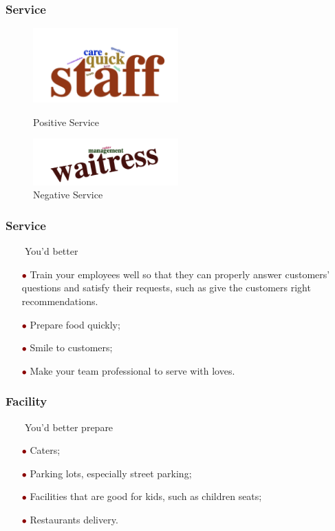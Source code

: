 \documentclass[notheorems, aspectratio=54]{beamer}
\renewcommand\textbullet{\ensuremath{\bullet}}
\begin{document}
\begin{frame}
\frametitle{Service}
\begin{figure}
	\begin{minipage}[t]{0.5\linewidth}
		\centering
		\includegraphics[width=2.2in]{staff_good.png}
		\caption{Positive Service}
		\label{fig:side:a}
	\end{minipage}%
	\begin{minipage}[t]{0.5\linewidth}
		\centering
		\includegraphics[width=2.2in]{staff_bad.png}
		\caption{Negative Service}
		\label{fig:side:b}
	\end{minipage}
\end{figure}
\end{frame}

\begin{frame}
\frametitle{Service}
\ \ \ \ You'd better
\begin{itemize}
	\item[\textcolor{darkred}{\textbullet}] Train your employees well so that they can properly answer customers' questions and satisfy their requests, such as give the customers right recommendations.
	\item[\textcolor{darkred}{\textbullet}] Prepare food quickly;
	\item[\textcolor{darkred}{\textbullet}] Smile to customers;
	\item[\textcolor{darkred}{\textbullet}] Make your team professional to serve with loves.
\end{itemize}

\end{frame}

\begin{frame}
\frametitle{Facility}
\ \ \ \ You'd better prepare
\begin{itemize}
	\item[\textcolor{darkred}{\textbullet}] Caters;
	\item[\textcolor{darkred}{\textbullet}] Parking lots, especially street parking;
	\item[\textcolor{darkred}{\textbullet}] Facilities that are good for kids, such as children seats;
	\item[\textcolor{darkred}{\textbullet}] Restaurants delivery.
\end{itemize}
\end{frame}
\end{document}
